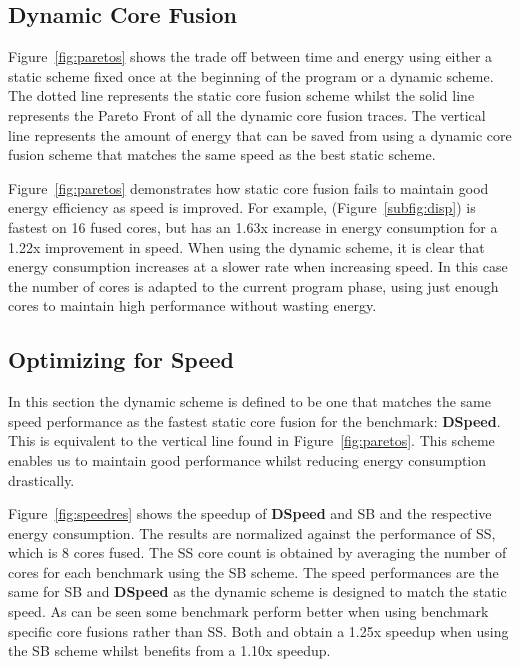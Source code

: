 \subsection{Dynamic Core Fusion}
Figure~\ref{fig:paretos} shows the trade off between time and energy using either a static scheme fixed once at the beginning of the program or a dynamic scheme.
The dotted line represents the static core fusion scheme whilst the solid line represents the Pareto Front of all the dynamic core fusion traces.
The vertical line represents the amount of energy that can be saved from using a dynamic core fusion scheme that matches the same speed as the best static scheme.

Figure~\ref{fig:paretos} demonstrates how static core fusion fails to maintain good energy efficiency as speed is improved.
For example,  (Figure~\ref{subfig:disp}) is fastest on 16 fused cores, but has an 1.63x increase in energy consumption for a 1.22x improvement in speed.
When using the dynamic scheme, it is clear that energy consumption increases at a slower rate when increasing speed.
In this case the number of cores is adapted to the current program phase, using just enough cores to maintain high performance without wasting energy.


\subsection{Optimizing for Speed} \label{sec:dyn:speed}

In this section the dynamic scheme is defined to be one that matches the same speed performance as the fastest static core fusion for the benchmark: \textbf{DSpeed}.
This is equivalent to the vertical line found in Figure~\ref{fig:paretos}.
This scheme enables us to maintain good performance whilst reducing energy consumption drastically.

Figure~\ref{fig:speedres} shows the speedup of \textbf{DSpeed} and SB and the respective energy consumption.
The results are normalized against the performance of SS, which is 8 cores fused.
The SS core count is obtained by averaging the number of cores for each benchmark using the SB scheme. 
The speed performances are the same for SB and \textbf{DSpeed} as the dynamic scheme is designed to match the static speed.
As can be seen some benchmark perform better when using benchmark specific core fusions rather than SS.
Both  and  obtain a 1.25x speedup when using the SB scheme whilst  benefits from a 1.10x speedup.

